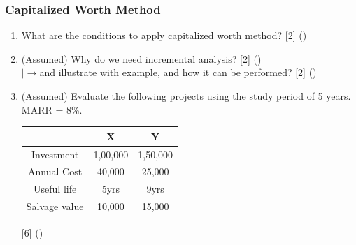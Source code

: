 \documentclass[12pt]{article}
\newcommand{\lb}{\\ $\left|\rightarrow\right.$}
\begin{document}
	\subsubsection{Capitalized Worth Method}
	\begin{enumerate}[noitemsep, topsep=0pt]
		\item What are the conditions to apply capitalized worth method? \hfill [2] ()
		
		\item (Assumed) Why do we need incremental analysis? \hfill [2] ()
		\lb and illustrate with example, and how it can be performed? \hfill [2] ()

		\item (Assumed) Evaluate the following projects using the study period of 5 years. MARR = 8\%.\\
		\begin{tabular}{|c|c|c|}
			\hline
			& X & Y \\ \hline
			Investment & 1,00,000 & 1,50,000 \\ \hline
			Annual Cost & 40,000 & 25,000 \\ \hline
			Useful life & 5yrs & 9yrs \\ \hline
			Salvage value & 10,000 & 15,000 \\ \hline
		\end{tabular} \hfill [6] ()
	\end{enumerate}
\end{document}
